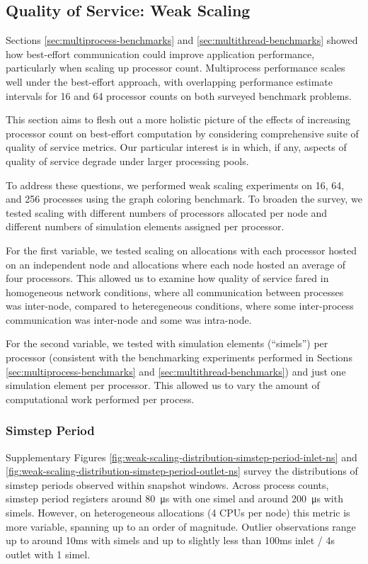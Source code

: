 \subsection{Quality of Service: Weak Scaling}
\label{sec:weak-scaling}

Sections \ref{sec:multiprocess-benchmarks} and \ref{sec:multithread-benchmarks} showed how best-effort communication could improve application performance, particularly when scaling up processor count.
Multiprocess performance scales well under the best-effort approach, with overlapping performance estimate intervals for 16 and 64 processor counts on both surveyed benchmark problems.

This section aims to flesh out a more holistic picture of the effects of increasing processor count on best-effort computation by considering comprehensive suite of quality of service metrics.
Our particular interest is in which, if any, aspects of quality of service degrade under larger processing pools.

To address these questions, we performed weak scaling experiments on 16, 64, and 256 processes using the graph coloring benchmark.
To broaden the survey, we tested scaling with different numbers of processors allocated per node and different numbers of simulation elements assigned per processor.

For the first variable, we tested scaling on allocations with each processor hosted on an independent node and allocations where each node hosted an average of four processors.
This allowed us to examine how quality of service fared in homogeneous network conditions, where all communication between processes was inter-node, compared to heteregeneous conditions, where some inter-process communication was inter-node and some was intra-node.

For the second variable, we tested with  simulation elements (``simels'') per processor (consistent with the benchmarking experiments performed in Sections \ref{sec:multiprocess-benchmarks} and \ref{sec:multithread-benchmarks}) and just one simulation element per processor.
This allowed us to vary the amount of computational work performed per process.

\subsubsection{Simstep Period}

Supplementary Figures \ref{fig:weak-scaling-distribution-simstep-period-inlet-ns} and \ref{fig:weak-scaling-distribution-simstep-period-outlet-ns} survey the distributions of simstep periods observed within snapshot windows.
Across process counts, simstep period registers around \SI{80}{\micro\second} with one simel and around \SI{200}{\micro\second} with  simels.
However, on heterogeneous allocations (4 CPUs per node) this metric is more variable, spanning up to an order of magnitude.
Outlier observations range up to around 10ms with  simels and up to slightly less than 100ms inlet / 4s outlet with 1 simel.

